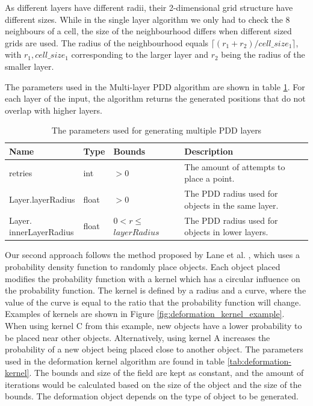 As different layers have different radii, their 2-dimensional grid structure have different sizes. While in the single layer algorithm we only had to check the 8 neighbours of a cell, the size of the neighbourhood differs when different sized grids are used. The radius of the neighbourhood equals $\lceil (r_1 + r_2) / cell\_size_1 \rceil$, with $r_1, cell\_size_1$ corresponding to the larger layer and $r_2$ being the radius of the smaller layer.

The parameters used in the Multi-layer PDD algorithm are shown in table \ref{tab:pdd-multi-layer}. For each layer of the input, the algorithm returns the generated positions that do not overlap with higher layers.

\begin{table}[h!]
\begin{tabularx}{\linewidth}{|l|l|l|X|}
\hline
Name & Type & Bounds & Description\\
\hline

retries & int & $ > 0 $ & The amount of attempts to place a point. \\

Layer.layerRadius & float & $> 0$ & The PDD radius used for objects in the same layer.\\

\makecell{Layer.\\innerLayerRadius} & float & \makecell{$0 < r \leq$\\$layerRadius$} & The PDD radius used for objects in lower layers.\\

\hline

\end{tabularx}
\caption{The parameters used for generating multiple PDD layers}
\label{tab:pdd-multi-layer}
\end{table}

Our second approach follows the method proposed by Lane et al. \cite{lane_generating_2002}, which uses a probability density function to randomly place objects. Each object placed modifies the probability function with a kernel which has a circular influence on the probability function. The kernel is defined by a radius and a curve, where the value of the curve is equal to the ratio that the probability function will change. Examples of kernels are shown in Figure \ref{fig:deformation_kernel_example}. When using kernel C from this example, new objects have a lower probability to be placed near other objects. Alternatively, using kernel A increases the probability of a new object being placed close to another object. The parameters used in the deformation kernel algorithm are found in table \ref{tab:deformation-kernel}. The bounds and size of the field are kept as constant, and the amount of iterations would be calculated based on the size of the object and the size of the bounds. The deformation object depends on the type of object to be generated.

